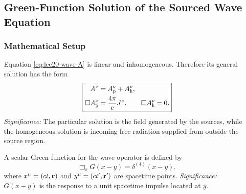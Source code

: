 
\subsection{Green-Function Solution of the Sourced Wave Equation}\label{subsec:lec20-green-solution}

\subsubsection*{Mathematical Setup}
Equation \eqref{eq:lec20-wave-A} is linear and inhomogeneous. Therefore its general
solution has the form
\begin{equation}\label{eq:lec20-general-solution}
  \boxed{\begin{aligned}
    A^\nu&=A^\nu_{\rm p}+A^\nu_{\rm h},\\
    \Box A^\nu_{\rm p}&=\frac{4\pi}{c}J^\nu,\qquad
    \Box A^\nu_{\rm h}=0.
  \end{aligned}}
\end{equation}
\textit{Significance:} The particular solution is the field generated by the sources, while the homogeneous solution is incoming free radiation supplied from outside the source region.

A scalar Green function for the wave operator is defined by
\begin{equation}\label{eq:lec20-green-definition}
  \boxed{\Box_xG(x-y)=\delta^{(4)}(x-y),}
\end{equation}
where $x^\mu=(ct,\mathbf{r})$ and $y^\mu=(ct',\mathbf{r}')$ are spacetime points.
\textit{Significance:} $G(x-y)$ is the response to a unit spacetime impulse located at $y$.

